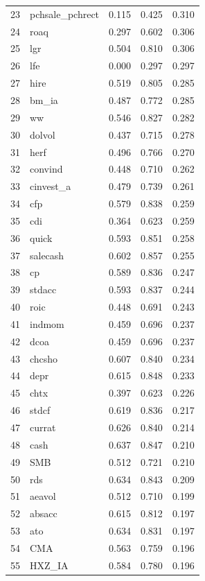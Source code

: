 \begin{footnotesize}
\begin{longtable}{rl|c|c|c}
		23 & pchsale\_pchrect & 0.115 & 0.425 & 0.310 \\ 
		24 & roaq & 0.297 & 0.602 & 0.306 \\ 
		25 & lgr & 0.504 & 0.810 & 0.306 \\ 
		26 & lfe & 0.000 & 0.297 & 0.297 \\ 
		27 & hire & 0.519 & 0.805 & 0.285 \\ 
		28 & bm\_ia & 0.487 & 0.772 & 0.285 \\ 
		29 & ww & 0.546 & 0.827 & 0.282 \\ 
		30 & dolvol & 0.437 & 0.715 & 0.278 \\ 
		31 & herf & 0.496 & 0.766 & 0.270 \\ 
		32 & convind & 0.448 & 0.710 & 0.262 \\ 
		33 & cinvest\_a & 0.479 & 0.739 & 0.261 \\ 
		34 & cfp & 0.579 & 0.838 & 0.259 \\ 
		35 & cdi & 0.364 & 0.623 & 0.259 \\ 
		36 & quick & 0.593 & 0.851 & 0.258 \\ 
		37 & salecash & 0.602 & 0.857 & 0.255 \\ 
		38 & cp & 0.589 & 0.836 & 0.247 \\ 
		39 & stdacc & 0.593 & 0.837 & 0.244 \\ 
		40 & roic & 0.448 & 0.691 & 0.243 \\ 
		41 & indmom & 0.459 & 0.696 & 0.237 \\ 
		42 & dcoa & 0.459 & 0.696 & 0.237 \\ 
		43 & chcsho & 0.607 & 0.840 & 0.234 \\ 
		44 & depr & 0.615 & 0.848 & 0.233 \\ 
		45 & chtx & 0.397 & 0.623 & 0.226 \\ 
		46 & stdcf & 0.619 & 0.836 & 0.217 \\ 
		47 & currat & 0.626 & 0.840 & 0.214 \\ 
		48 & cash & 0.637 & 0.847 & 0.210 \\ 
		49 & SMB & 0.512 & 0.721 & 0.210 \\ 
		50 & rds & 0.634 & 0.843 & 0.209 \\ 
		51 & aeavol & 0.512 & 0.710 & 0.199 \\ 
		52 & absacc & 0.615 & 0.812 & 0.197 \\ 
		53 & ato & 0.634 & 0.831 & 0.197 \\ 
		54 & CMA & 0.563 & 0.759 & 0.196 \\ 
		55 & HXZ\_IA & 0.584 & 0.780 & 0.196 \\ 

\end{longtable}
\end{footnotesize}
